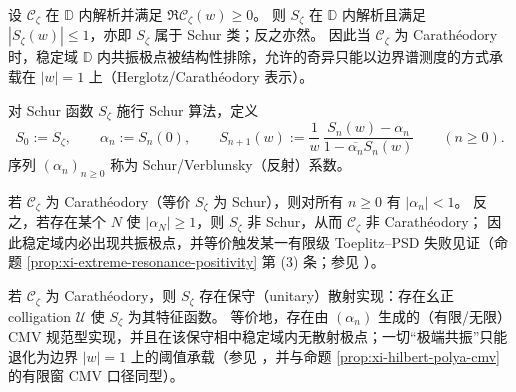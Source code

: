 \begin{theorem}\label{thm:xi-horizon-carath-schur-equivalence}
设 \(\mathscr{C}_{\zeta}\) 在 \(\mathbb{D}\) 内解析并满足 \(\Re \mathscr{C}_{\zeta}(w)\ge 0\)。
则 \(S_{\zeta}\) 在 \(\mathbb{D}\) 内解析且满足 \(|S_{\zeta}(w)|\le 1\)，亦即 \(S_{\zeta}\) 属于 Schur 类；反之亦然。
因此当 \(\mathscr{C}_{\zeta}\) 为 Carath\'eodory 时，稳定域 \(\mathbb{D}\) 内共振极点被结构性排除，允许的奇异只能以边界谱测度的方式承载在 \(|w|=1\) 上（Herglotz/Carath\'eodory 表示）。
\end{theorem}

\begin{definition}\label{def:xi-horizon-schur-parameters}
对 Schur 函数 \(S_{\zeta}\) 施行 Schur 算法，定义
\[
S_0:=S_{\zeta},\qquad \alpha_n:=S_n(0),\qquad
S_{n+1}(w):=\frac{1}{w}\,\frac{S_n(w)-\alpha_n}{1-\overline{\alpha_n}S_n(w)}\qquad(n\ge 0).
\]
序列 \((\alpha_n)_{n\ge 0}\) 称为 Schur/Verblunsky（反射）系数。
\end{definition}

\begin{theorem}[反射系数越界的有限否证器]\label{thm:xi-horizon-reflection-finite-witness}
若 \(\mathscr{C}_{\zeta}\) 为 Carath\'eodory（等价 \(S_{\zeta}\) 为 Schur），则对所有 \(n\ge 0\) 有 \(|\alpha_n|<1\)。
反之，若存在某个 \(N\) 使 \(|\alpha_N|\ge 1\)，则 \(S_{\zeta}\) 非 Schur，从而 \(\mathscr{C}_{\zeta}\) 非 Carath\'eodory；
因此稳定域内必出现共振极点，并等价触发某一有限级 Toeplitz--PSD 失败见证（命题 \ref{prop:xi-extreme-resonance-positivity} 第 (3) 条；参见 \cite{Simon2005OPUC1}）。
\end{theorem}

\begin{theorem}[保守实现与端点阈值承载]\label{thm:xi-horizon-conservative-realization}
若 \(\mathscr{C}_{\zeta}\) 为 Carath\'eodory，则 \(S_{\zeta}\) 存在保守（unitary）散射实现：存在幺正 colligation \(\mathcal U\) 使 \(S_{\zeta}\) 为其特征函数。
等价地，存在由 \((\alpha_n)\) 生成的（有限/无限）CMV 规范型实现，并且在该保守相中稳定域内无散射极点；一切“极端共振”只能退化为边界 \(|w|=1\) 上的阈值承载（参见 \cite{CanteroMoralVelazquez2003CMV,Simon2005OPUC1}，并与命题 \ref{prop:xi-hilbert-polya-cmv} 的有限窗 CMV 口径同型）。
\end{theorem}

